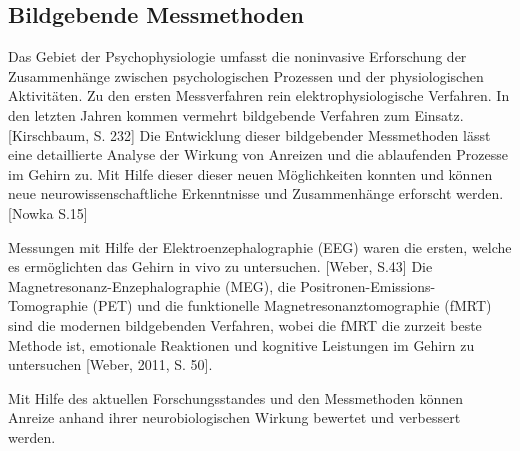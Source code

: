 \subsection{Bildgebende Messmethoden}
Das Gebiet der Psychophysiologie umfasst die noninvasive Erforschung der Zusammenhänge zwischen psychologischen Prozessen und der physiologischen Aktivitäten. Zu den ersten Messverfahren rein elektrophysiologische Verfahren. In den letzten Jahren kommen vermehrt bildgebende Verfahren zum Einsatz. [Kirschbaum, S. 232]
Die Entwicklung dieser bildgebender Messmethoden lässt eine detaillierte Analyse der Wirkung von Anreizen und die ablaufenden Prozesse im Gehirn  zu. Mit Hilfe dieser dieser neuen Möglichkeiten konnten und können neue neurowissenschaftliche Erkenntnisse und Zusammenhänge erforscht werden.  [Nowka S.15]
 
Messungen mit Hilfe der Elektroenzephalographie (EEG) waren die ersten, welche es ermöglichten das Gehirn in vivo zu untersuchen. [Weber, S.43]  Die Magnetresonanz-Enzephalographie (MEG), die Positronen-Emissions-Tomographie (PET)  und die funktionelle Magnetresonanztomographie (fMRT) sind die modernen bildgebenden Verfahren, wobei die fMRT die zurzeit beste Methode ist, emotionale Reaktionen und kognitive Leistungen im Gehirn zu untersuchen [Weber, 2011, S. 50].
 
Mit Hilfe des aktuellen Forschungsstandes und den \glqq Messmethoden können Anreize anhand ihrer neurobiologischen Wirkung bewertet und verbessert werden.\grqq [Nowka S. 17]